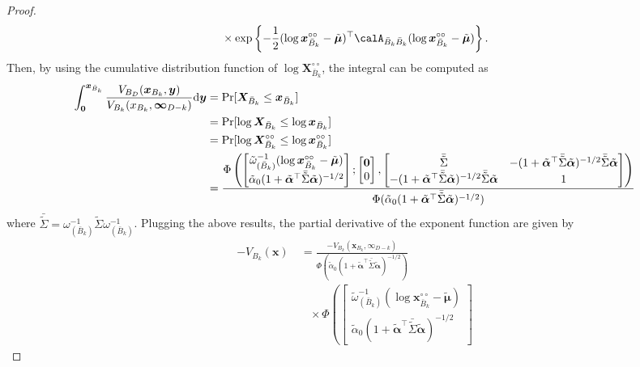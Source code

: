 \documentclass[12pt]{article}
\begin{document}
\begin{proof}
\begin{align*}
&\quad \times \exp\left\{-\frac{1}{2} (\log \bm x_{\bar B_k}^{\circ\circ}-\tilde{\bm\mu})^\top \calA_{\bar B_k \bar B_k} (\log \bm x_{\bar B_k}^{\circ\circ}-\tilde{\bm\mu})\right\}. 
\end{align*}
Then, by using the cumulative distribution function of $\log\bm X_{\bar B_k}^{\circ\circ}$, the integral can be computed as
\begin{align*}
   \int_{\bm 0}^{\bm x_{\bar B_k}}\frac{V_{B_D}(\bm x_{B_k},\bm y)}{V_{B_k}(x_{B_k},\bm\infty_{D-k})} \text d \bm y 
   &= \Pr[\bm X_{\bar B_k} \leq \bm x_{\bar B_k}] \\
& = \Pr[\log\bm X_{\bar B_k} \leq \log\bm x_{\bar B_k}]\\
& = \Pr[\log\bm X_{\bar B_k}^{\circ\circ} \leq \log\bm x_{\bar B_k}^{\circ\circ}] \\
& =  \frac{\Phi\left(
\begin{bmatrix} \tilde\omega^{-1}_{(\bar B_k)}(\log \bm x_{\bar B_k}^{\circ\circ} - \tilde{\bm\mu})  \\\tilde\alpha_0(1+\tilde{\bm\alpha}^\top\bar{\tilde\Sigma}\tilde{\bm\alpha})^{-1/2}
\end{bmatrix};
\begin{bmatrix}
\bm 0 \\ 0
\end{bmatrix},
\begin{bmatrix}
	\bar{\tilde\Sigma} & -(1+\tilde{\bm\alpha}^\top\bar{\tilde\Sigma}\tilde{\bm\alpha})^{-1/2}\bar{\tilde\Sigma}\tilde{\bm\alpha} \\
-(1+\tilde{\bm\alpha}^\top\bar{\tilde\Sigma}\tilde{\bm\alpha})^{-1/2}\bar{\tilde\Sigma}\tilde{\bm\alpha} &	1
\end{bmatrix} 
\right)}{\Phi(\tilde\alpha_0(1+\tilde{\bm\alpha}^\top\bar{\tilde\Sigma}\tilde{\bm\alpha})^{-1/2})}   
\end{align*}
where $\bar{\tilde\Sigma} = \omega_{(\bar B_k)}^{-1}\tilde\Sigma\omega_{(\bar B_k)}^{-1}$. 
Plugging the above results, the partial derivative of the exponent function are given by
\begin{align*}
   -V_{B_k}(\bm x) &\ =  
   \frac{-V_{B_k}(\bm x_{B_k},\bm \infty_{D-k})}{\Phi(\tilde\alpha_0(1+\tilde{\bm\alpha}^\top\bar{\tilde\Sigma}\tilde{\bm\alpha})^{-1/2})} \\
   & \quad \times
   \Phi\left(
   \begin{bmatrix} \tilde\omega^{-1}_{(\bar B_k)}(\log \bm x_{\bar B_k}^{\circ\circ} - \tilde{\bm\mu})  \\
\tilde\alpha_0(1+\tilde{\bm\alpha}^\top\bar{\tilde\Sigma}\tilde{\bm\alpha})^{-1/2}

\end{bmatrix}
\end{align*}
\end{proof}
\end{document}
